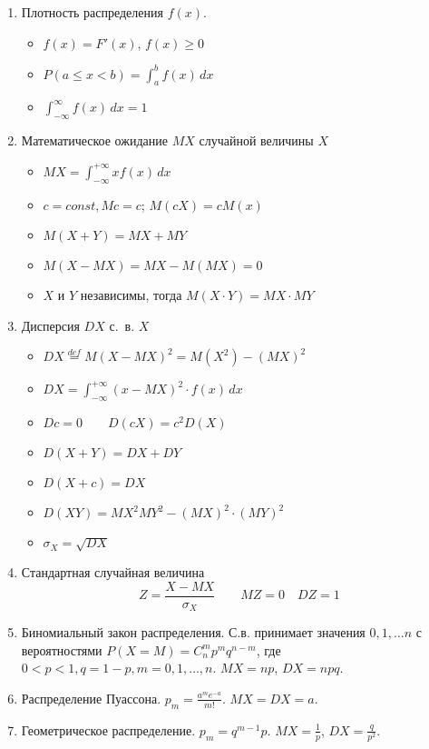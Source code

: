 \documentclass{article}
\begin{document}
\begin{multicols}{2}
\begin{enumerate}
    \item Плотность распределения $f(x)$.
        \begin{itemize}
            \item $f(x) = F'(x)$, $f(x) \geq 0 $
            \item $P(a \leq x < b) = \int_a^b f(x) \, dx$
            \item $\int_{-\infty}^\infty f(x) \, dx = 1$
        \end{itemize}

    \item Математическое ожидание $MX$ случайной величины $X$
        \begin{itemize}
            \item $MX = \int_{-\infty}^{+\infty} x  f(x) \, dx$
            \item $c = const, Mc = c$; $M(cX) = c M(x)$
            \item $M(X+Y) = MX + MY$
            \item $M(X - MX) = MX - M(MX) = 0$
            \item $X$ и $Y$ независимы, тогда $M(X \cdot Y) = MX \cdot MY$
        \end{itemize}
    \item Дисперсия $DX$ с.~в. $X$
        \begin{itemize}
            \item $DX \stackrel{def}{=} M(X - MX)^2  = M(X^2) - (MX)^2$
            \item $DX = \int_{-\infty}^{+\infty} (x - MX)^2 \cdot f(x) \, dx$
            \item $Dc = 0 \qquad D(cX) = c^2 D(X)$
            \item $D(X + Y) = DX + DY$
            \item $D(X + c) = DX$
            \item $D(XY) = MX^2 MY^2 - (MX)^2 \cdot (MY)^2$
            \item $\sigma_X = \sqrt{DX}$
        \end{itemize}
    \item Стандартная случайная величина
        \[ Z = \frac{X - MX}{\sigma_X} \qquad MZ = 0 \quad DZ = 1 \]
    \item Биномиальный закон распределения. С.в. принимает значения $0, 1, \ldots n$
        с вероятностями $P(X = M) = C_n^m p^m q^{n-m}$, где $0 < p < 1, q = 1 - p, m = 0, 1, \ldots, n$.
        $MX = np$, $DX = npq$.
    \item Распределение Пуассона.
        $p_m = \frac{a^m e^{-a}}{m!}$. $MX = DX = a$.
    \item Геометрическое распределение.
        $p_m = q^{m-1} p$. $MX = \frac{1}{p}$, $DX = \frac{q}{p^2}$.
        

\end{enumerate}
\end{multicols}
\end{document}
